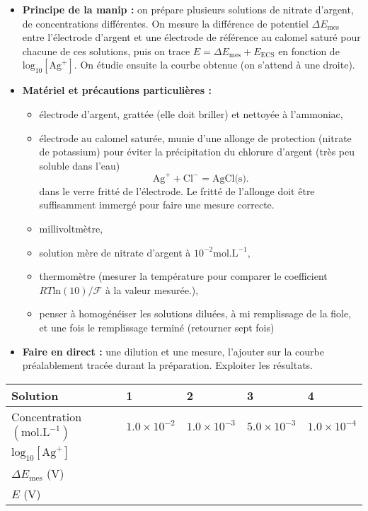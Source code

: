 \documentclass[11pt,a4paper]{report}
\begin{document}
\begin{itemize}
	\item \textbf{Principe de la manip :} on prépare plusieurs solutions de nitrate d'argent, de concentrations différentes. On mesure la différence de potentiel $\Delta E_\text{mes}$ entre l'électrode d'argent et une électrode de référence au calomel saturé pour chacune de ces solutions, puis on trace $E = \Delta E_\text{mes} + E_\text{ECS}$ en fonction de $\text{log}_{10}[\text{Ag}^+]$. On étudie ensuite la courbe obtenue (on s'attend à une droite).
	\item \textbf{Matériel et précautions particulières :}
	\begin{itemize}
		\item électrode d'argent, grattée (elle doit briller) et nettoyée à l'ammoniac,
		\item électrode au calomel saturée, munie d'une allonge de protection (nitrate de potassium) pour éviter la précipitation du chlorure d'argent (très peu soluble dans l'eau)
		\begin{equation}
			\text{Ag}^+ + \text{Cl}^- = \text{AgCl(s)}.	
		\end{equation}				
		dans le verre fritté de l'électrode. Le fritté de l'allonge doit être suffisamment immergé pour faire une mesure correcte.
		\item millivoltmètre,
		\item solution mère de nitrate d'argent à $10^{-2} \text{mol.L}^{-1}$,
		\item thermomètre (mesurer la température pour comparer le coefficient $RT\text{ln}(10)/\mathcal{F}$ à la valeur mesurée.),
		\item penser à homogénéiser les solutions diluées, à mi remplissage de la fiole, et une fois le remplissage terminé (retourner sept fois)
	\end{itemize}
	\item \textbf{Faire en direct :} une dilution et une mesure, l'ajouter sur la courbe préalablement tracée durant la préparation. Exploiter les résultats.
\end{itemize}

\begin{center}
\begin{tabular}{|l|l|l|l|l|}
  \hline
  Solution & 1 & 2 & 3 & 4\\
  \hline
  Concentration $(\text{mol.L}^{-1})$ & $1.0\times 10^{-2}$ & $1.0\times 10^{-3}$ & $5.0\times 10^{-3}$ & $1.0\times 10^{-4}$\\
  \hline
  $\text{log}_{10}[\text{Ag}^+]$ & & & &\\
  \hline
  $\Delta E_\text{mes}$ (V) & & & &\\
  \hline
  $E$ (V) & & & &\\
  \hline
\end{tabular}
\end{center}
\end{document}
